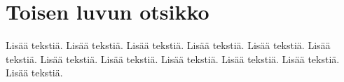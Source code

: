 \chapter{Toisen luvun otsikko} \label{Toinen luku}

Lisää tekstiä. Lisää tekstiä. Lisää tekstiä. Lisää tekstiä. Lisää
tekstiä. Lisää tekstiä. Lisää tekstiä. Lisää tekstiä. Lisää tekstiä.
Lisää tekstiä. Lisää tekstiä. Lisää tekstiä.
